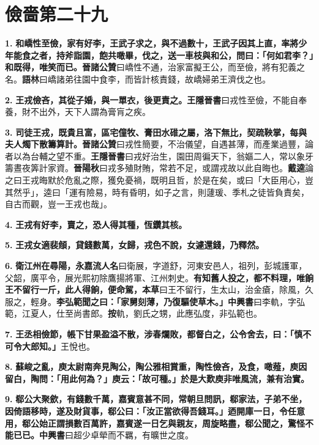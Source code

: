 \chapter{儉嗇第二十九}

\textbf{1.} \textbf{和嶠性至儉，家有好李，王武子求之，與不過數十，王武子因其上直，率將少年能食之者，持斧詣園，飽共噉畢，伐之，送一車枝與和公，問曰：「何如君李？」和既得，唯笑而已。}{\footnotesize \textbf{晉諸公贊}曰嶠性不通，治家富擬王公，而至儉，將有犯義之名。\textbf{語林}曰嶠諸弟往園中食李，而皆計核責錢，故嶠婦弟王濟伐之也。}

\textbf{2.} \textbf{王戎儉吝，其從子婚，與一單衣，後更責之。}{\footnotesize \textbf{王隱晉書}曰戎性至儉，不能自奉養，財不出外，天下人謂為膏肓之疾。}

\textbf{3.} \textbf{司徒王戎，既貴且富，區宅僮牧、膏田水碓之屬，洛下無比，契疏鞅掌，每與夫人燭下散籌算計。}{\footnotesize \textbf{晉諸公贊}曰戎性簡要，不治儀望，自遇甚薄，而產業過豐，論者以為台輔之望不重。\textbf{王隱晉書}曰戎好治生，園田周徧天下，翁嫗二人，常以象牙籌晝夜筭計家資。\textbf{晉陽秋}曰戎多殖財賄，常若不足，或謂戎故以此自晦也。\textbf{戴逵}論之曰王戎晦默於危亂之際，獲免憂禍，既明且哲，於是在矣，或曰「大臣用心，豈其然乎」，逵曰「運有險易，時有昏明，如子之言，則蘧瑗、季札之徒皆負責矣，自古而觀，豈一王戎也哉」。}

\textbf{4.} \textbf{王戎有好李，賣之，恐人得其種，恆鑽其核。}

\textbf{5.} \textbf{王戎女適裴頠，貸錢數萬，女歸，戎色不說，女遽還錢，乃釋然。}

\textbf{6.} \textbf{衛江州在尋陽，}{\footnotesize \textbf{永嘉流人名}曰衛展，字道舒，河東安邑人，祖列，彭城護軍，父韶，廣平令，展光熙初除鷹揚將軍、江州刺史。}\textbf{有知舊人投之，都不料理，唯餉王不留行一斤，此人得餉，便命駕，}{\footnotesize \textbf{本草}曰王不留行，生太山，治金瘡，除風，久服之，輕身。}\textbf{李弘範聞之曰：「家舅刻薄，乃復驅使草木。」}{\footnotesize \textbf{中興書}曰李軌，字弘範，江夏人，仕至尚書郎。\textbf{按}軌，劉氏之甥，此應弘度，非弘範也。}

\textbf{7.} \textbf{王丞相儉節，帳下甘果盈溢不散，涉春爛敗，都督白之，公令舍去，曰：「慎不可令大郎知。」}{\footnotesize 王悅也。}

\textbf{8.} \textbf{蘇峻之亂，庾太尉南奔見陶公，陶公雅相賞重，陶性儉吝，及食，噉薤，庾因留白，陶問：「用此何為？」庾云：「故可種。」於是大歎庾非唯風流，兼有治實。}

\textbf{9.} \textbf{郗公大聚歛，有錢數千萬，嘉賓意甚不同，常朝旦問訊，郗家法，子弟不坐，因倚語移時，遂及財貨事，郗公曰：「汝正當欲得吾錢耳。」迺開庫一日，令任意用，郗公始正謂損數百萬許，嘉賓遂一日乞與親友，周旋略盡，郗公聞之，驚怪不能已已。}{\footnotesize \textbf{中興書}曰超少卓犖而不羈，有曠世之度。}